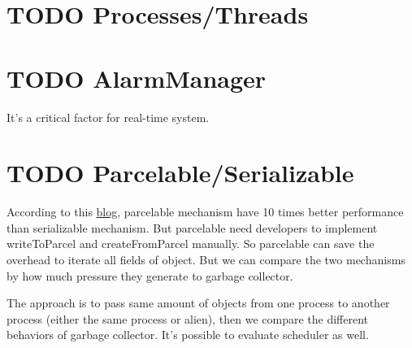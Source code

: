 \documentclass[11pt]{article}
\begin{document}
\section{{\bfseries\sffamily TODO} \label{Processes/Threads}Processes/Threads}
\label{sec-5}

\section{{\bfseries\sffamily TODO} AlarmManager}
\label{sec-6}
It's a critical factor for real-time system.

\section{{\bfseries\sffamily TODO} \label{Parcelable/Serializable}Parcelable/Serializable}
\label{sec-7}
According to this \href{http://www.developerphil.com/parcelable-vs-serializable/}{blog}, parcelable mechanism have 10 times better performance than serializable mechanism.
But parcelable need developers to implement writeToParcel and createFromParcel manually.
So parcelable can save the overhead to iterate all fields of object.
But we can compare the two mechanisms by how much pressure they generate to garbage collector.

The approach is to pass same amount of objects from one process to another process (either the same process or alien),
then we compare the different behaviors of garbage collector.
It's possible to evaluate scheduler as well.
\end{document}
